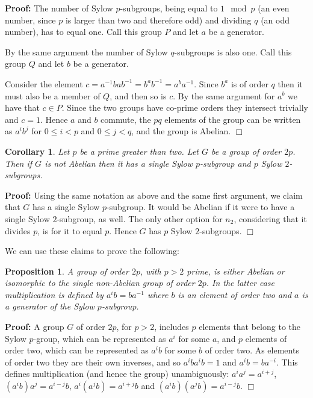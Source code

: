 \documentclass[11pt]{article} \usepackage{amssymb}
\newtheorem{proposition}[theorem]{Proposition}
\newtheorem{corollary}[theorem]{Corollary}
\newenvironment{proof}{\noindent \textbf{Proof:}}{$\Box$}
\begin{document}
\begin{enumerate}
\begin{proof}
      The number of Sylow $p$-subgroups, 
      being equal to $1\mod p$ (an even number, since $p$ is larger than two
      and therefore odd) and dividing $q$ (an odd number), 
      has to equal one. Call this group $P$ and let $a$ be a generator.
      
      By the same argument the number of Sylow $q$-subgroups is also one.
      Call this group $Q$ and let $b$ be a generator.
      
      Consider the element $c=a^{-1}bab^{-1}=b^ab^{-1}=a^ba^{-1}$. Since
      $b^a$ is of order $q$ then it must also be a member of $Q$, and then
      so is $c$. By the same argument for $a^b$ we have that $c \in P$. Since
      the two groups have co-prime orders they intersect trivially and $c=1$. 
      Hence $a$ and $b$ commute, the $pq$ elements of the group can be written 
      as $a^ib^j$ for $0\leq i <p$ and $0\leq j < q$, and the group is Abelian.
    \end{proof}
    \begin{corollary}
      \label{prop:2p_groups}
      Let $p$ be a prime greater than two. Let $G$ be a group of order
      $2p$. Then if $G$ is not Abelian then it has a single Sylow $p$-subgroup
      and $p$ Sylow $2$-subgroups.
    \end{corollary}
    \begin{proof}
      Using the same notation as above and the same first argument, we claim
      that $G$ has a single Sylow $p$-subgroup. It would be Abelian if it were 
      to have a single Sylow $2$-subgroup, as well. The only other option for
      $n_2$, considering that it divides $p$, is for it to equal $p$. Hence
      $G$ has $p$ Sylow $2$-subgroups.
    \end{proof}

    We can use these claims to prove the following:
    \begin{proposition}
      \label{prop:2p_unique}
      A group of order $2p$, with $p>2$ prime, is either Abelian or isomorphic 
      to the single non-Abelian
      group of order $2p$. In the latter case multiplication is defined by
      $a^ib=ba^{-1}$ where $b$ is an element of order two and $a$ is a generator
      of the Sylow $p$-subgroup.
    \end{proposition}
    \begin{proof}
      A group $G$ of order $2p$, for $p>2$, includes $p$ elements that 
      belong to the Sylow $p$-group,
      which can be represented as $a^i$ for some $a$, and $p$ elements of order
      two, which can be represented as $a^ib$ for some $b$ of order two. As
      elements of order two they are their own inverses, and so $a^iba^ib=1$ and
      $a^ib=ba^{-i}$. This defines multiplication (and hence the group) 
      unambiguously: $a^ia^j=a^{i+j}$,
      $(a^ib)a^j=a^{i-j}b$, $a^i(a^jb)=a^{i+j}b$ and $(a^ib)(a^jb)=a^{i-j}b$.
    \end{proof}


\end{enumerate}
\end{document}
